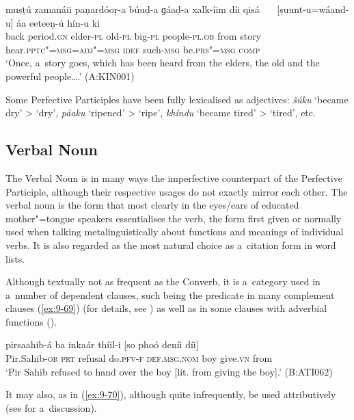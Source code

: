 \begin{exe}
\ex
\label{ex:9-68}
\gll muṣṭú zamanáii paṇardóoṛ-a búuḍ-a ɡáaḍ-a xalk-íim díi {qisá~~~} [ṣuunt-u=wáand-u] áa eeteeṇ-ú hín-u ki\\
back period.\textsc{gn} elder-\textsc{pl} old-\textsc{pl} big-\textsc{pl}  people-\textsc{pl.ob} from story hear.\textsc{pptc"=msg=adj"=msg} \textsc{idef} such-\textsc{msg} be.\textsc{prs"=msg} \textsc{comp} \\
\glt `Once, a~story goes, which has been heard from the elders, the old and the powerful people{\ldots}.'
(A:KIN001)
\end{exe}

Some Perfective Participles have been fully lexicalised as adjectives: \textit{šúku} `became dry' {\textgreater} `dry', \textit{páaku} `ripened' {\textgreater} `ripe', \textit{khíndu} `became tired' {\textgreater} `tired', etc.


\subsection{Verbal Noun}
\label{subsec:9-3-3}


The Verbal Noun is in many ways the imperfective counterpart of the Perfective Participle, although their respective usages do not exactly mirror each other. The verbal noun is the form that most clearly in the eyes/ears of educated mother"=tongue speakers essentialises the verb, the form first given or normally used when talking metalinguistically about functions and meanings of individual verbs. It is also regarded as the most natural choice as a~citation form in word lists. 


Although textually not as frequent as the Converb, it is a~category used in a~number of dependent clauses, such being the predicate in many complement clauses (\ref{ex:9-69}) (for details, see ) as well as in some clauses with adverbial functions ().

\begin{exe}
\ex
\label{ex:9-69}
\gll pirsaahib-á ba inkaár thíil-i [so phoó deníi díi] \\
Pir.Sahib-\textsc{ob} \textsc{prt} refusal do.\textsc{pfv-f} \textsc{def.msg.nom} boy give.\textsc{vn} from \\
\glt `Pir Sahib refused to hand over the boy [lit. from giving the boy].' (B:ATI062)
\end{exe}

It may also, as in (\ref{ex:9-70}), although quite infrequently, be used attributively (see  for a~discussion).

